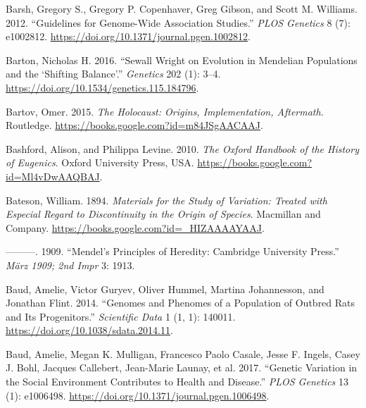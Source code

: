 \documentclass[
]{book}
\newlength{\cslhangindent}
\newlength{\cslentryspacingunit} %
\newenvironment{CSLReferences}[2] %
 {%
  \setlength{\parindent}{0pt}
  \ifodd #1
  \let\oldpar\par
  \def\par{\hangindent=\cslhangindent\oldpar}
  \fi
  \setlength{\parskip}{#2\cslentryspacingunit}
 }%
 {}
\begin{document}
\begin{CSLReferences}{1}{0}
\leavevmode{}%
Barsh, Gregory S., Gregory P. Copenhaver, Greg Gibson, and Scott M. Williams. 2012. {``Guidelines for {Genome-Wide Association Studies}.''} \emph{PLOS Genetics} 8 (7): e1002812. \url{https://doi.org/10.1371/journal.pgen.1002812}.

\leavevmode{}%
Barton, Nicholas H. 2016. {``Sewall {Wright} on {Evolution} in {Mendelian Populations} and the {`{Shifting Balance}'}.''} \emph{Genetics} 202 (1): 3--4. \url{https://doi.org/10.1534/genetics.115.184796}.

\leavevmode{}%
Bartov, Omer. 2015. \emph{The {Holocaust}: {Origins}, {Implementation}, {Aftermath}}. {Routledge}. \url{https://books.google.com?id=m84JSgAACAAJ}.

\leavevmode{}%
Bashford, Alison, and Philippa Levine. 2010. \emph{The {Oxford Handbook} of the {History} of {Eugenics}}. {Oxford University Press, USA}. \url{https://books.google.com?id=Ml4vDwAAQBAJ}.

\leavevmode{}%
Bateson, William. 1894. \emph{Materials for the {Study} of {Variation}: {Treated} with {Especial Regard} to {Discontinuity} in the {Origin} of {Species}}. {Macmillan and Company}. \url{https://books.google.com?id=_HIZAAAAYAAJ}.

\leavevmode{}%
---------. 1909. {``Mendel's {Principles} of {Heredity}: {Cambridge University Press}.''} \emph{März 1909; 2nd Impr} 3: 1913.

\leavevmode{}%
Baud, Amelie, Victor Guryev, Oliver Hummel, Martina Johannesson, and Jonathan Flint. 2014. {``Genomes and Phenomes of a Population of Outbred Rats and Its Progenitors.''} \emph{Scientific Data} 1 (1, 1): 140011. \url{https://doi.org/10.1038/sdata.2014.11}.

\leavevmode{}%
Baud, Amelie, Megan K. Mulligan, Francesco Paolo Casale, Jesse F. Ingels, Casey J. Bohl, Jacques Callebert, Jean-Marie Launay, et al. 2017. {``Genetic {Variation} in the {Social Environment Contributes} to {Health} and {Disease}.''} \emph{PLOS Genetics} 13 (1): e1006498. \url{https://doi.org/10.1371/journal.pgen.1006498}.


\end{CSLReferences}
\end{document}
